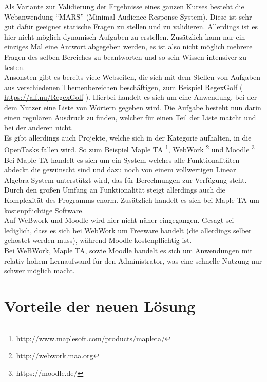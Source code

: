 Als Variante zur Validierung der Ergebnisse eines ganzen Kurses besteht die Webanwendung ``MARS'' (Minimal Audience Response System). Diese ist sehr gut dafür geeignet statische Fragen zu stellen und zu validieren. Allerdings ist es hier nicht möglich dynamisch Aufgaben zu erstellen. Zusätzlich kann nur ein einziges Mal eine Antwort abgegeben werden, es ist also nicht möglich mehrere Fragen des selben Bereiches zu beantworten und so sein Wissen intensiver zu testen. \\

Ansonsten gibt es bereits viele Webseiten, die sich mit dem Stellen von Aufgaben aus verschiedenen Themenbereichen beschäftigen, zum Beispiel RegexGolf ( \url{https://alf.nu/RegexGolf} ). Hierbei handelt es sich um eine Anwendung, bei der dem Nutzer eine Liste von Wörtern gegeben wird. Die Aufgabe besteht nun darin einen regulären Ausdruck zu finden, welcher für einen Teil der Liste matcht und bei der anderen nicht. \\

Es gibt allerdings auch Projekte, welche sich in der Kategorie aufhalten, in die OpenTasks fallen wird. So zum Beispiel Maple TA \footnote{http://www.maplesoft.com/products/mapleta/}, WebWork \footnote{http://webwork.maa.org} und Moodle \footnote{https://moodle.de/} \\
Bei Maple TA handelt es sich um ein System welches alle Funktionalitäten abdeckt die gewünscht sind und dazu noch von einem vollwertigen Linear Algebra System unterstützt wird, das für Berechnungen zur Verfügung steht. Durch den großen Umfang an Funktionalität steigt allerdings auch die Komplexität des Programms enorm. Zusätzlich handelt es sich bei Maple TA um kostenpflichtige Software.\\
Auf WeBwork und Moodle wird hier nicht näher eingegangen. Gesagt sei lediglich, dass es sich bei WebWork um Freeware handelt (die allerdings selber gehostet werden muss), während Moodle kostenpflichtig ist. \\
Bei WeBWork, Maple TA, sowie Moodle handelt es sich um Anwendungen mit relativ hohem Lernaufwand für den Administrator, was eine schnelle Nutzung nur schwer möglich macht.


\section{Vorteile der neuen Lösung}

